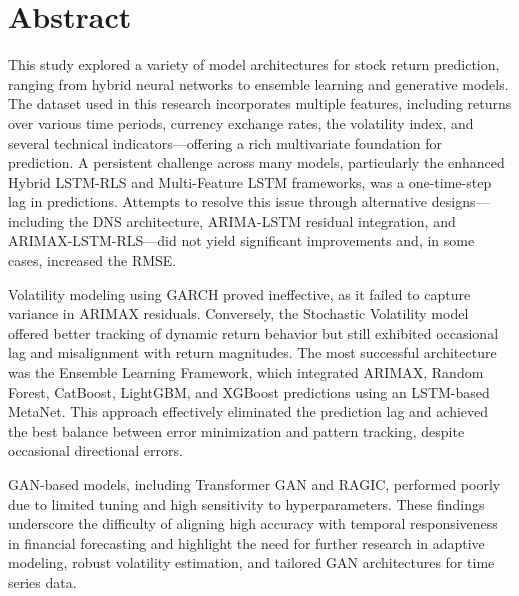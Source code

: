 \chapter*{Abstract}

This study explored a variety of model architectures for stock return prediction, ranging from hybrid neural networks to ensemble learning and generative models. The dataset used in this research incorporates multiple features, including returns over various time periods, currency exchange rates, the volatility index, and several technical indicators—offering a rich multivariate foundation for prediction. A persistent challenge across many models, particularly the enhanced Hybrid LSTM-RLS and Multi-Feature LSTM frameworks, was a one-time-step lag in predictions. Attempts to resolve this issue through alternative designs—including the DNS architecture, ARIMA-LSTM residual integration, and ARIMAX-LSTM-RLS—did not yield significant improvements and, in some cases, increased the RMSE.

Volatility modeling using GARCH proved ineffective, as it failed to capture variance in ARIMAX residuals. Conversely, the Stochastic Volatility model offered better tracking of dynamic return behavior but still exhibited occasional lag and misalignment with return magnitudes. The most successful architecture was the Ensemble Learning Framework, which integrated ARIMAX, Random Forest, CatBoost, LightGBM, and XGBoost predictions using an LSTM-based MetaNet. This approach effectively eliminated the prediction lag and achieved the best balance between error minimization and pattern tracking, despite occasional directional errors.

GAN-based models, including Transformer GAN and RAGIC, performed poorly due to limited tuning and high sensitivity to hyperparameters. These findings underscore the difficulty of aligning high accuracy with temporal responsiveness in financial forecasting and highlight the need for further research in adaptive modeling, robust volatility estimation, and tailored GAN architectures for time series data.